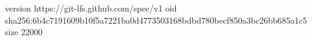 version https://git-lfs.github.com/spec/v1
oid sha256:6b4c7191609b10f5a7221ba0d4773503168bdbd780becf850a3bc26bb685a1c5
size 22000
